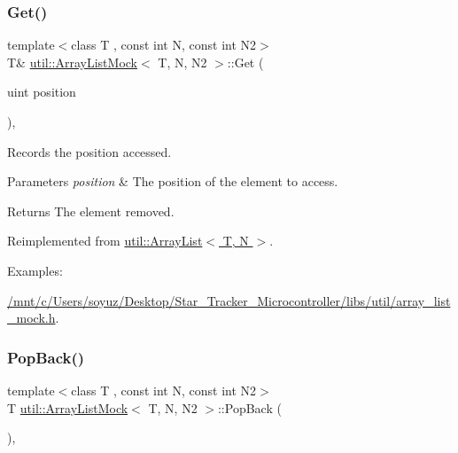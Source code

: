 \subsubsection{\texorpdfstring{Get()}{Get()}}
{\footnotesize\ttfamily template$<$class T , const int N, const int N2$>$ \\
T\& \hyperlink{classutil_1_1ArrayListMock}{util\+::\+Array\+List\+Mock}$<$ T, N, N2 $>$\+::Get (\begin{DoxyParamCaption}\item[{uint}]{position }\end{DoxyParamCaption})\hspace{0.3cm}{\ttfamily [inline]}, {\ttfamily [virtual]}}



Records the position accessed. 


\begin{DoxyParams}{Parameters}
{\em position} & The position of the element to access. \\
\hline
\end{DoxyParams}
\begin{DoxyReturn}{Returns}
The element removed. 
\end{DoxyReturn}


Reimplemented from \hyperlink{classutil_1_1ArrayList_ac5a4259af59f7bac9df06851c29d9e37}{util\+::\+Array\+List$<$ T, N $>$}.

\begin{Desc}
\item[Examples\+: ]\par
\hyperlink{_2mnt_2c_2Users_2soyuz_2Desktop_2Star_Tracker_Microcontroller_2libs_2util_2array_list_mock_8h-example}{/mnt/c/\+Users/soyuz/\+Desktop/\+Star\+\_\+\+Tracker\+\_\+\+Microcontroller/libs/util/array\+\_\+list\+\_\+mock.\+h}.\end{Desc}
\mbox{\label{classutil_1_1ArrayListMock_ac6244094b159f4ab8986bf865afa90ff}} 
\subsubsection{\texorpdfstring{Pop\+Back()}{PopBack()}}
{\footnotesize\ttfamily template$<$class T , const int N, const int N2$>$ \\
T \hyperlink{classutil_1_1ArrayListMock}{util\+::\+Array\+List\+Mock}$<$ T, N, N2 $>$\+::Pop\+Back (\begin{DoxyParamCaption}{ }\end{DoxyParamCaption})\hspace{0.3cm}{\ttfamily [inline]}, {\ttfamily [virtual]}}



